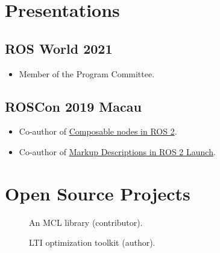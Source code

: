 \documentclass[english, letterpaper]{resume}
\begin{document}
\noindent\begin{minipage}[t]{0.475\linewidth}
  \section*{Presentations}
  \subsection*[\icon{ros}]{ROS World 2021}
  \begin{itemize}
    \item Member of the Program Committee.
  \end{itemize}
  \subsection*[\icon{ros}]{ROSCon 2019 Macau}
  \begin{itemize}
    \item Co-author of \href{https://roscon.ros.org/2019/talks/roscon2019_composablenodes.pdf}{Composable nodes in  ROS 2}.
    \item Co-author of \href{https://roscon.ros.org/2019/talks/roscon2019_markupextensionsforros2launch.pdf}{Markup Descriptions in ROS 2 Launch}.
  \end{itemize}
\end{minipage}\hfill
\begin{minipage}[t]{0.475\linewidth}
  \section*{Open Source Projects}
  \begin{description}
    \item[] An MCL library (contributor).
    \item[] LTI optimization toolkit (author).
  \end{description}
\end{minipage}
\end{document}
